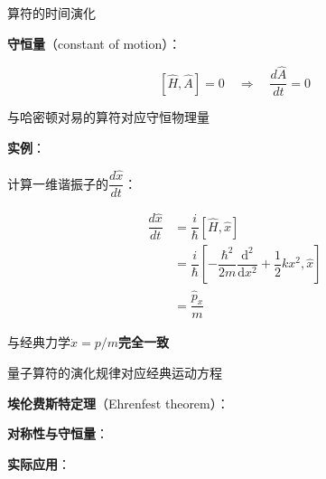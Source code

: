 \documentclass[aspectratio=169, 10pt]{beamer}
\begin{document}
\begin{frame}{算符的时间演化}
{    
    \begin{iqbitemize}
    \item \textbf{守恒量}（constant of motion）：
    \end{iqbitemize}
      \[
      [\hat{H}, \hat{A}] = 0 \quad \Rightarrow \quad \dfrac{d\hat{A}}{dt} = 0
      \]
    \begin{iqbitemize}
    \item 与哈密顿对易的算符对应守恒物理量
    \item \textbf{实例}：
    \end{iqbitemize}
  }{
    \begin{iqbitemize}
    \item 计算一维谐振子的$\dfrac{d\hat{x}}{dt}$：
    \end{iqbitemize}
      \[
        \begin{aligned}
          \dfrac{d\hat{x}}{dt} &= \dfrac{i}{\hbar}[\hat{H}, \hat{x}] \\
          &= \dfrac{i}{\hbar}\left[-\dfrac{\hbar^2}{2m}\dfrac{\mathrm{d}^2}{\mathrm{d}x^2} + \dfrac{1}{2}kx^2, \hat{x}\right] \\
          &= \dfrac{\hat{p}_x}{m}
        \end{aligned}
      \]
    \begin{iqbitemize}
    \item 与经典力学$\dot{x} = p/m$\textbf{完全一致}
    \item 量子算符的演化规律对应经典运动方程
    \end{iqbitemize}
    \iqbsmallsep

    \begin{iqbitemize}
    \item \textbf{埃伦费斯特定理}（Ehrenfest theorem）：
    \item \textbf{对称性与守恒量}：
    \item \textbf{实际应用}：
    \end{iqbitemize}
    \iqbtinysep

  }
\end{frame}
\end{document}
